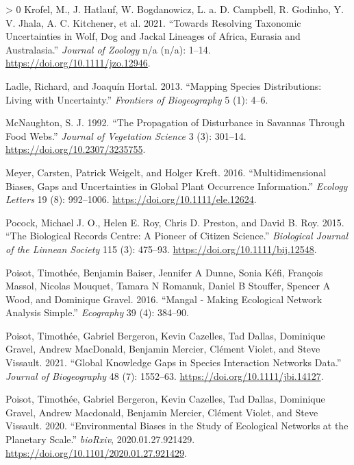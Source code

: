 \documentclass[10pt,oneside]{article}
\newlength{\cslhangindent}
\newenvironment{CSLReferences}[3] %
 {%
  \setlength{\parindent}{0pt}
  \ifodd #1 \everypar{\setlength{\hangindent}{\cslhangindent}}\ignorespaces\fi
  \ifnum #2 > 0
  \setlength{\parskip}{#2\baselineskip}
  \fi
 }%
 {}
\begin{document}
\begin{CSLReferences}{1}{0}
\leavevmode\hypertarget{ref-Krofel2021ResTax}{}%
Krofel, M., J. Hatlauf, W. Bogdanowicz, L. a. D. Campbell, R. Godinho,
Y. V. Jhala, A. C. Kitchener, et al. 2021. {``Towards Resolving
Taxonomic Uncertainties in Wolf, Dog and Jackal Lineages of Africa,
Eurasia and Australasia.''} \emph{Journal of Zoology} n/a (n/a): 1--14.
\url{https://doi.org/10.1111/jzo.12946}.

\leavevmode\hypertarget{ref-Ladle2013MapSpe}{}%
Ladle, Richard, and Joaquín Hortal. 2013. {``Mapping Species
Distributions: Living with Uncertainty.''} \emph{Frontiers of
Biogeography} 5 (1): 4--6.

\leavevmode\hypertarget{ref-McNaughton1992ProDis}{}%
McNaughton, S. J. 1992. {``The Propagation of Disturbance in Savannas
Through Food Webs.''} \emph{Journal of Vegetation Science} 3 (3):
301--14. \url{https://doi.org/10.2307/3235755}.

\leavevmode\hypertarget{ref-Meyer2016MulBia}{}%
Meyer, Carsten, Patrick Weigelt, and Holger Kreft. 2016.
{``Multidimensional Biases, Gaps and Uncertainties in Global Plant
Occurrence Information.''} \emph{Ecology Letters} 19 (8): 992--1006.
\url{https://doi.org/10.1111/ele.12624}.

\leavevmode\hypertarget{ref-Pocock2015BioRec}{}%
Pocock, Michael J. O., Helen E. Roy, Chris D. Preston, and David B. Roy.
2015. {``The Biological Records Centre: A Pioneer of Citizen Science.''}
\emph{Biological Journal of the Linnean Society} 115 (3): 475--93.
\url{https://doi.org/10.1111/bij.12548}.

\leavevmode\hypertarget{ref-Poisot2016ManMak}{}%
Poisot, Timothée, Benjamin Baiser, Jennifer A Dunne, Sonia Kéfi,
François Massol, Nicolas Mouquet, Tamara N Romanuk, Daniel B Stouffer,
Spencer A Wood, and Dominique Gravel. 2016. {``Mangal - Making
Ecological Network Analysis Simple.''} \emph{Ecography} 39 (4): 384--90.

\leavevmode\hypertarget{ref-Poisot2021GloKno}{}%
Poisot, Timothée, Gabriel Bergeron, Kevin Cazelles, Tad Dallas,
Dominique Gravel, Andrew MacDonald, Benjamin Mercier, Clément Violet,
and Steve Vissault. 2021. {``Global Knowledge Gaps in Species
Interaction Networks Data.''} \emph{Journal of Biogeography} 48 (7):
1552--63. \url{https://doi.org/10.1111/jbi.14127}.

\leavevmode\hypertarget{ref-Poisot2020EnvBia}{}%
Poisot, Timothée, Gabriel Bergeron, Kevin Cazelles, Tad Dallas,
Dominique Gravel, Andrew Macdonald, Benjamin Mercier, Clément Violet,
and Steve Vissault. 2020. {``Environmental Biases in the Study of
Ecological Networks at the Planetary Scale.''} \emph{bioRxiv},
2020.01.27.921429. \url{https://doi.org/10.1101/2020.01.27.921429}.


\end{CSLReferences}
\end{document}
